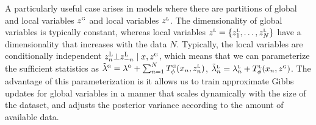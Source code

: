 \documentclass[anonymous=false, %
               format=acmsmall, %
               review=true, %
               screen=true, %
               nonacm=true]{acmart}
\theoremstyle{definition}
\begin{document}
A particularly useful case arises in models where there are partitions of global and local variables $z^{\textsc{g}}$ and local variables $z^{\textsc{l}}$. The dimensionality of global variables is typically constant, whereas local variables $z^\textsc{l} = \{z^\textsc{l}_1, \ldots, z^\textsc{l}_N\}$ have a dimensionality that increases with the data $N$. Typically, the local variables are conditionally independent $z^\textsc{L}_n \bot z^\textsc{L}_{-n} \mid x, z^\textsc{g}$, which means that we can parameterize the sufficient statistics as $\tilde{\lambda}^\textsc{g}=\lambda^\textsc{g}+\sum_{n=1}^N T^\textsc{g}_\phi(x_n, z^\textsc{l}_{n})$, $\tilde{\lambda}^\textsc{l}_n=\lambda^\textsc{l}_n + T^\textsc{l}_\phi(x_n, z^\textsc{g})$.
The advantage of this parameterization is it allows us to train approximate Gibbs updates for global variables in a manner that scales dynamically with the size of the dataset, and adjusts the posterior variance according to the amount of available data.
\end{document}
